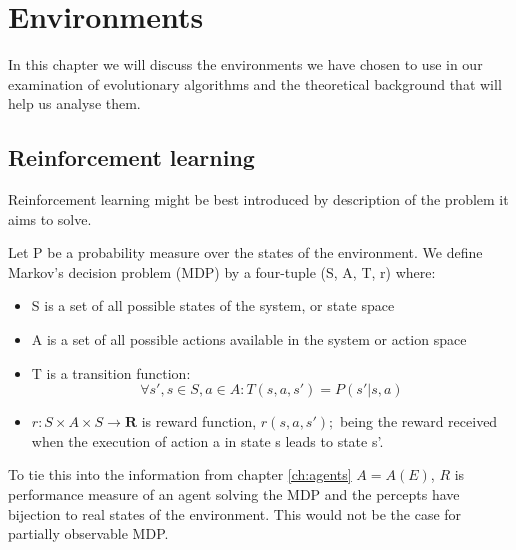 \chapter{Environments}
\label{chap:environment}
In this chapter we will discuss the environments we have chosen to use in our examination of evolutionary algorithms and the theoretical background that will help us analyse them.

\section{Reinforcement learning}
\label{sec:RL}
Reinforcement learning might be best introduced by description of the problem it aims to solve.
\begin{defn}
Let P be a probability measure over the states of the environment. We define Markov’s decision problem (MDP) by a four-tuple (S, A, T, r) where:
\begin{itemize}
	\item S is a set of all possible states of the system, or state space
	\item A is a set of all possible actions available in the system or action space
	\item T is a transition function:
	$$\forall s',s \in S, a\in A: T(s, a,  s')=P(s'|s,a)$$
	\item $ r: S\times A\times S \rightarrow \boldsymbol{R} $ is reward function, $ r(s, a, s') ;$ being the reward received when the execution of action a in state s leads to state s'.
\end{itemize}
\end{defn}
To tie this into the information from chapter \ref{ch:agents} $ A=A(E)$, $ R $ is performance measure of an agent solving the MDP and the percepts have bijection to real states of the environment. This would not be the case for partially observable MDP.
